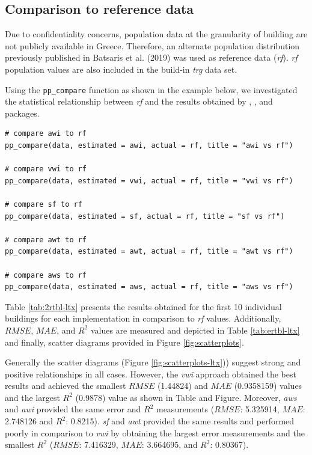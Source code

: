 \begin{figure}
\end{figure}

\hypertarget{comparison-to-reference-data}{%
\subsection{Comparison to reference data}\label{comparison-to-reference-data}}

Due to confidentiality concerns, population data at the granularity of building are not publicly available in Greece. Therefore, an alternate population distribution previously published in Batsaris et al. (2019) was used as reference data (\emph{rf}). \emph{rf} population values are also included in the build-in \emph{trg} data set.

Using the \texttt{pp\_compare} function as shown in the example below, we investigated the statistical relationship between \emph{rf} and the results obtained by , , and  packages.

\begin{verbatim}
# compare awi to rf
pp_compare(data, estimated = awi, actual = rf, title = "awi vs rf")

# compare vwi to rf
pp_compare(data, estimated = vwi, actual = rf, title = "vwi vs rf")

# compare sf to rf
pp_compare(data, estimated = sf, actual = rf, title = "sf vs rf")

# compare awt to rf
pp_compare(data, estimated = awt, actual = rf, title = "awt vs rf")

# compare aws to rf
pp_compare(data, estimated = aws, actual = rf, title = "aws vs rf")
\end{verbatim}

Table \ref{tab:2rtbl-ltx} presents the results obtained for the first 10 individual buildings for each implementation in comparison to \emph{rf} values. Additionally, \(RMSE\), \(MAE\), and \(R^2\) values are measured and depicted in
Table \ref{tab:ertbl-ltx} and finally, scatter diagrams provided in Figure \ref{fig:scatterplots}.

Generally the scatter diagrams (Figure \ref{fig:scatterplots-ltx})) suggest strong and positive relationships in all cases. However, the \emph{vwi} approach obtained the best results and achieved the smallest \(RMSE\) (1.44824) and \(MAE\) (0.9358159) values and the largest \(R^2\) (0.9878) value as shown in Table and Figure. Moreover, \emph{aws} and \emph{awi} provided the same error and \(R^2\) measurements (\(RMSE\): 5.325914, \(MAE\): 2.748126 and \(R^2\): 0.8215). \emph{sf} and \emph{awt} provided the same results and performed poorly in comparison to \emph{vwi} by obtaining the largest error measurements and the smallest \(R^2\) (\(RMSE\): 7.416329, \(MAE\): 3.664695, and \(R^2\): 0.80367).


